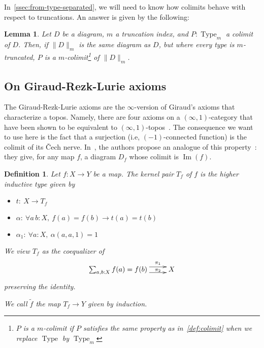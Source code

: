 \documentclass[preprint,9pt,numbers]{sigplanconf}
\makeatletter
\newtheorem{defi}[thm]{Definition}
\newtheorem{lem}[thm]{Lemma}
\newcommand{\ie}{i.e,\xspace}
\def\dar[#1]#2{\ar@<-#2>[#1]\ar@<#2>[#1]} %
\DeclareMathOperator{\Type}{Type}
\DeclareMathOperator{\im}{Im}
\newcommand \colim[1] {\mathrm{colim}(Q)}
\newenvironment{mymath}[1][-0em]{%
  \newcommand\mymathaux{\vspace{#1}}%
  \vspace{#1}%
  \begin{equation*}%
  }{ %
    \mymathaux%
  \end{equation*}}
\makeatother
\begin{document}
In~\ref{ssec:from-type-separated}, we will need to know how colimits
behave with respect to truncations. An answer is given by the following:

\begin{lem}
  Let $D$ be a diagram, $m$ a truncation index, and
  $P:\Type_{m}$ a colimit of $D$. 
  Then, if $\|D\|_m$ is the same diagram as $D$, but where every type
  is $m$-truncated, $P$ is a $m$-colimit\footnote{$P$ is a $m$-colimit
    if $P$ satisfies the same property as in~\ref{def:colimit} when
    we replace $\Type$ by $\Type_m$} of $\|D\|_m$.
\end{lem}



\subsection{On Giraud-Rezk-Lurie axioms}
\label{ssec:giraud-ax}

The Giraud-Rezk-Lurie axioms are the $\infty$-version of Giraud's
axioms that characterize a topos. Namely, there are four axioms on a
$(\infty,1)$-category that have been shown to be equivalent to
$(\infty,1)$-topos~\cite[Chapter 6]{lurie}.
%
The consequence we want to use here is the fact that a surjection
(\ie{} $(-1)$-connected function) is the colimit of its \v{C}ech
nerve.
%
In~\cite{boulier}, the authors propose an analogue of this property~:
they give, for any map $f$, a diagram $D_f$ whose colimit is $\im(f)$.

\begin{defi}
  Let $f:X \to Y$ be a map. The kernel pair $T_f$ of $f$ is the higher inductive type given
  by
  \begin{itemize}
  \item $t:~X \to T_f$
  \item $\alpha:~\forall a\,b:X,~f(a) = f(b) \to t(a) = t(b)$
  \item $\alpha_1:~\forall a:X,~\alpha(a, a, 1) = 1$
  \end{itemize}
  We view $T_f$ as the coequalizer of
  \begin{mymath}\xymatrix{
    \sum_{a,b:X} f(a) = f(b) \dar[r]{4pt}^-{\pi_1}_-{\pi_2} & X
  }\end{mymath}%
  preserving the identity.

  We call $\tilde f$ the map $T_f \to Y$ given by induction.
\end{defi}
\end{document}
